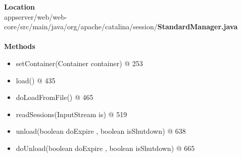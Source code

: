 \textbf{Location}\\
appserver/web/web-core/src/main/java/org/apache/catalina/session/\textbf{StandardManager.java}\\
\\
\textbf{Methods}
\begin{itemize}
	\item setContainer(Container container) @ 253
	\item load() @ 435
	\item doLoadFromFile() @ 465
	\item readSessions(InputStream is) @ 519
	\item unload(boolean doExpire , boolean isShutdown) @ 638
	\item doUnload(boolean doExpire , boolean isShutdown) @ 665
\end{itemize}